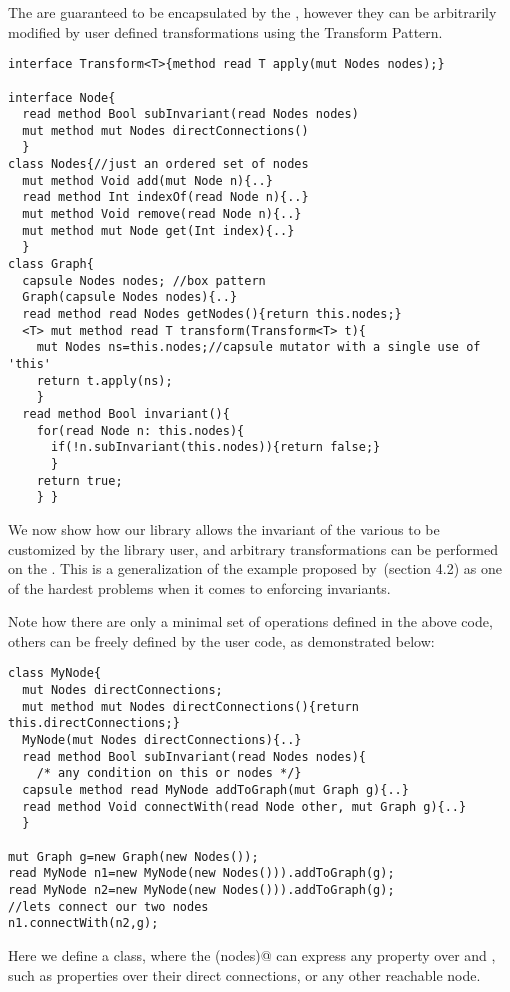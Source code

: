 The \Q@Node@s are guaranteed to be encapsulated by the \Q@Graph@, however they can be arbitrarily modified by user defined transformations using the Transform Pattern.
\begin{lstlisting}
interface Transform<T>{method read T apply(mut Nodes nodes);}

interface Node{
  read method Bool subInvariant(read Nodes nodes)
  mut method mut Nodes directConnections()
  }
class Nodes{//just an ordered set of nodes 
  mut method Void add(mut Node n){..}
  read method Int indexOf(read Node n){..}
  mut method Void remove(read Node n){..}
  mut method mut Node get(Int index){..}
  }
class Graph{ 
  capsule Nodes nodes; //box pattern
  Graph(capsule Nodes nodes){..}
  read method read Nodes getNodes(){return this.nodes;}
  <T> mut method read T transform(Transform<T> t){
    mut Nodes ns=this.nodes;//capsule mutator with a single use of 'this'
    return t.apply(ns);
    }
  read method Bool invariant(){
    for(read Node n: this.nodes){
      if(!n.subInvariant(this.nodes)){return false;}
      }
    return true;
    } }
\end{lstlisting}
We now show how our \Q@Graph@ library allows the invariant of the various \Q@Node@s to be customized by the library user, and arbitrary transformations can be performed on the \Q@Graph@s. This is a generalization of the example proposed by~\cite{Summers:2009:NFO:1562154.1562160}(section 4.2) as one of the hardest problems when it comes to enforcing invariants.

Note how there are only a minimal set of operations defined in the above code, %
others can be freely defined by the user code, as demonstrated below:

\begin{lstlisting}
class MyNode{
  mut Nodes directConnections;
  mut method mut Nodes directConnections(){return this.directConnections;}
  MyNode(mut Nodes directConnections){..}
  read method Bool subInvariant(read Nodes nodes){
    /* any condition on this or nodes */}  
  capsule method read MyNode addToGraph(mut Graph g){..}
  read method Void connectWith(read Node other, mut Graph g){..}
  }

mut Graph g=new Graph(new Nodes());
read MyNode n1=new MyNode(new Nodes())).addToGraph(g);
read MyNode n2=new MyNode(new Nodes())).addToGraph(g);
//lets connect our two nodes
n1.connectWith(n2,g);
\end{lstlisting}
Here we define a \Q@MyNode@ class, where the \Q@subInvariant(nodes)@ can express any property over \Q@this@ and \Q@nodes@, such as properties over their direct connections, or any other reachable node.

